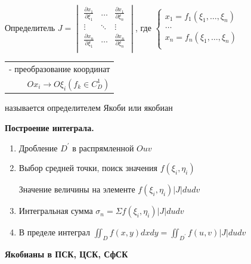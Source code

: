 \documentclass[12pt]{article}
\begin{document}
    \Def Определитель $J = \begin{vmatrix}
                               \frac{\partial x_1}{\partial \xi_1} & \dots  & \frac{\partial x_1}{\partial \xi_n} \\
                               \vdots                              & \ddots & \vdots                              \\
                               \frac{\partial x_n}{\partial \xi_1} & \dots  & \frac{\partial x_n}{\partial \xi_n} \\
    \end{vmatrix}$, где $\begin{cases}
                             x_1 = f_1(\xi_1, \dots, \xi_n) \\
                             \dots \\
                             x_n = f_n(\xi_1, \dots, \xi_n) \\
    \end{cases}$ \begin{tabular}{r} - преобразование координат \\ $Ox_i \to O\xi_i (f_k \in C^1_D)$ \end{tabular}

    называется определителем Якоби или якобиан

    \vspace{5mm}

    \textbf{Построение интеграла.}
    \begin{enumerate}
        \item Дробление $D^\prime$ в распрямленной $Ouv$
        \item Выбор средней точки, поиск значения $f(\xi_i, \eta_i)$

        Значение величины на элементе $f(\xi_i, \eta_i) |J| du dv$
        \item Интегральная сумма $\sigma_n = \Sigma f(\xi_i, \eta_i) |J| du dv$
        \item В пределе интеграл $\iint_D f(x, y) dx dy = \iint_{D^\prime} f(u, v) |J| du dv$
    \end{enumerate}

    \vspace{5mm}

    \textbf{Якобианы в ПСК, ЦСК, СфСК}
\end{document}
